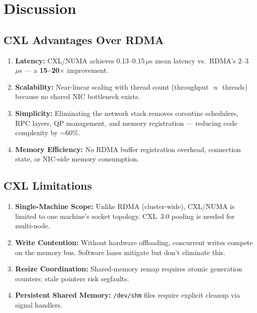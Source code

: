 \documentclass[conference]{IEEEtran}
\begin{document}
\section{Discussion}

\subsection{CXL Advantages Over RDMA}

\begin{enumerate}[nosep]
  \item \textbf{Latency:} CXL/NUMA achieves 0.13--0.15\,$\mu$s mean latency vs.\ RDMA's 2--3\,$\mu$s --- a \textbf{15--20$\times$} improvement.
  \item \textbf{Scalability:} Near-linear scaling with thread count (throughput $\propto$ threads) because no shared NIC bottleneck exists.
  \item \textbf{Simplicity:} Eliminating the network stack removes coroutine schedulers, RPC layers, QP management, and memory registration --- reducing code complexity by $\sim$60\%.
  \item \textbf{Memory Efficiency:} No RDMA buffer registration overhead, connection state, or NIC-side memory consumption.
\end{enumerate}

\subsection{CXL Limitations}

\begin{enumerate}[nosep]
  \item \textbf{Single-Machine Scope:} Unlike RDMA (cluster-wide), CXL/NUMA is limited to one machine's socket topology. CXL~3.0 pooling is needed for multi-node.
  \item \textbf{Write Contention:} Without hardware offloading, concurrent writes compete on the memory bus. Software lanes mitigate but don't eliminate this.
  \item \textbf{Resize Coordination:} Shared-memory remap requires atomic generation counters; stale pointers risk segfaults.
  \item \textbf{Persistent Shared Memory:} \texttt{/dev/shm} files require explicit cleanup via signal handlers.
\end{enumerate}
\end{document}
